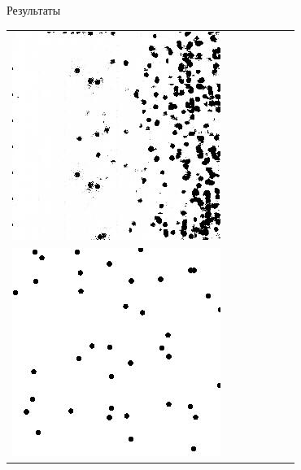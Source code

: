 \documentclass[12pt]{beamer}
\begin{document}
\begin{frame}{Результаты}
\begin{table}
\begin{center}
\begin{tabular}{p{1.2cm} p{1.2cm} p{1.2cm} p{1.2cm} p{1.2cm} p{1.2cm} p{1.2cm}}
					\includegraphics[width=1\linewidth]{8-results/sand-trend2/nf32/gen1}
					\\
					\includegraphics[width=1\linewidth]{8-results/sand-trend2/left2}

\end{tabular}
\end{center}
\end{table}
\end{frame}
\end{document}
